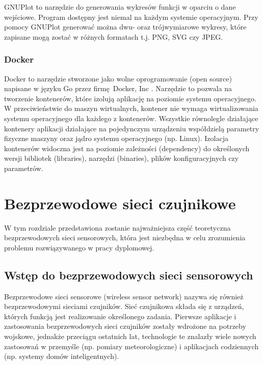 \documentclass[a4paper,12pt,twoside,openany]{report}
\begin{document}
GNUPlot to narzędzie do generowania wykresów funkcji w oparciu o dane wejściowe. Program dostępny jest niemal na każdym systemie operacyjnym.
Przy pomocy GNUPlot generować można dwu- oraz trójwymiarowe wykresy, które zapisane mogą zostać w różnych formatach t.j. PNG, SVG czy JPEG.

\subsection{Docker}

Docker to narzędzie stworzone jako wolne oprogramowanie (open source) napisane w języku Go przez firmę Docker, Inc \cite{DockerBook}.
Narzędzie to pozwala na tworzenie kontenerów, które izolują aplikację na poziomie systemu operacyjnego. W przeciwieństwie do maszyn wirtualnych, kontener nie wymaga
wirtualizowania systemu operacyjnego dla każdego z kontenerów. Wszystkie równolegle działające kontenery aplikacji działające na pojedynczym urządzeniu współdzielą
parametry fizyczne maszyny oraz jądro systemu operacyjnego (np. Linux). Izolacja kontenerów widoczna jest na poziomie zależności (dependency) do określonych wersji
bibliotek (libraries), narzędzi (binaries), plików konfiguracyjnych czy parametrów.

\chapter{Bezprzewodowe sieci czujnikowe}

W tym rozdziale przedstawiona zostanie najważniejsza część teoretyczna bezprzewodowych sieci sensorowych, która jest niezbędna w celu zrozumienia problemu
rozwiązywanego w pracy dyplomowej.

\section{Wstęp do bezprzewodowych sieci sensorowych}
Bezprzewodowe sieci sensorowe (wireless sensor network) nazywa się również bezprzewodowymi sieciami czujników.
Sieć czujnikowa składa się z urządzeń, których funkcją jest realizowanie określonego zadania.
Pierwsze aplikacje i zastosowania bezprzewodowych sieci czujników zostały wdrożone na potrzeby wojskowe, jednakże przeciągu ostatnich lat, technologie te znalazły
wiele nowych zastosowań w przemyśle (np. pomiary meteorologiczne) i aplikacjach codziennych (np. systemy domów inteligentnych).
\end{document}
